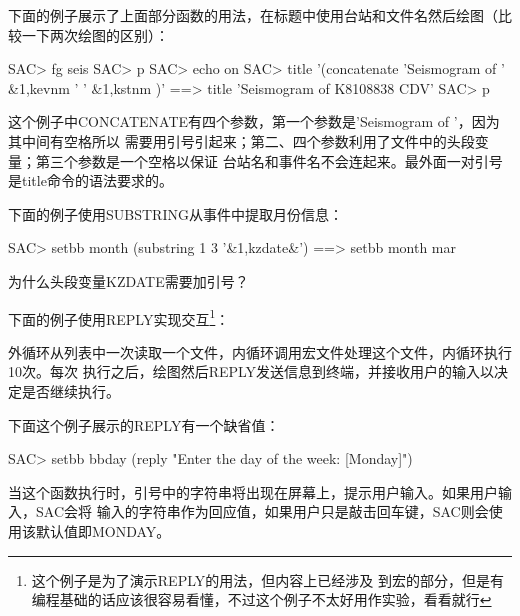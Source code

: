 下面的例子展示了上面部分函数的用法，在标题中使用台站和文件名然后绘图（比较一下两次绘图的区别）：
\begin{SACCode}
SAC> fg seis
SAC> p
SAC> echo on
SAC> title '(concatenate 'Seismogram of ' &1,kevnm ' ' &1,kstnm )'
 ==> title 'Seismogram of K8108838 CDV'
SAC> p
\end{SACCode}
这个例子中CONCATENATE有四个参数，第一个参数是'Seismogram of '，因为其中间有空格所以
需要用引号引起来；第二、四个参数利用了文件中的头段变量；第三个参数是一个空格以保证
台站名和事件名不会连起来。最外面一对引号是title命令的语法要求的。

下面的例子使用SUBSTRING从事件中提取月份信息：
\begin{SACCode}
SAC> setbb month (substring 1 3 '&1,kzdate&')
 ==> setbb month mar
\end{SACCode}
为什么头段变量KZDATE需要加引号？

下面的例子使用REPLY实现交互\footnote{这个例子是为了演示REPLY的用法，但内容上已经涉及
到宏的部分，但是有编程基础的话应该很容易看懂，不过这个例子不太好用作实验，看看就行}：
外循环从列表中一次读取一个文件，内循环调用宏文件处理这个文件，内循环执行10次。每次
执行之后，绘图然后REPLY发送信息到终端，并接收用户的输入以决定是否继续执行。

下面这个例子展示的REPLY有一个缺省值：
\begin{SACCode}
SAC> setbb bbday (reply "Enter the day of the week: [Monday]") 
\end{SACCode}
当这个函数执行时，引号中的字符串将出现在屏幕上，提示用户输入。如果用户输入，SAC会将
输入的字符串作为回应值，如果用户只是敲击回车键，SAC则会使用该默认值即MONDAY。
